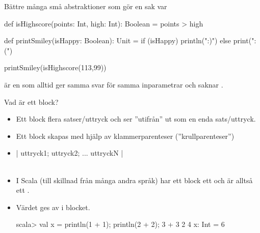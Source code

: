 \begin{Slide}{Bättre många små abstraktioner som gör en sak var}

\begin{Code}[basicstyle=\ttfamily\fontsize{8}{11}\selectfont]
def isHighscore(points: Int, high: Int): Boolean = points > high

def printSmiley(isHappy: Boolean): Unit =
  if (isHappy) println(":)") else print(":(")
\end{Code}

\pause\vspace{2em}
\begin{REPLnonum}
  printSmiley(isHighscore(113,99))
\end{REPLnonum}

\pause\vspace{1em}\noindent {} är en  som alltid ger samma svar för samma inparametrar och saknar .

\end{Slide}



\begin{Slide}{Vad är ett block?}

\begin{itemize}
\item Ett block  flera satser/uttryck och ser ''utifrån'' ut som en enda sats/uttryck.

\item Ett block skapas med hjälp av klammerparenteser (''krullparenteser'')

\item [] {\fontsize{14}{18}\selectfont \code|{ uttryck1; uttryck2; ... uttryckN }|}\\~

\pause

\item I Scala (till skillnad från många andra språk) har ett block ett  och är alltså ett .

\item Värdet ges av  i blocket.

\begin{REPLnonum}
scala> val x = { println(1 + 1); println(2 + 2); 3 + 3 }
2
4
x: Int = 6
\end{REPLnonum}


\end{itemize}

\end{Slide}

